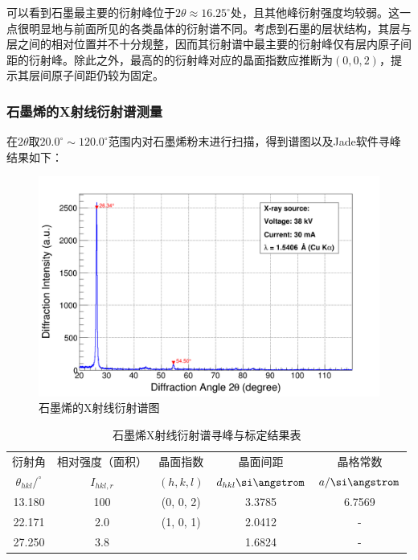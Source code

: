 \documentclass{thuemp}
\begin{document}
可以看到石墨最主要的衍射峰位于$2\theta \approx 16.25^\circ$处，且其他峰衍射强度均较弱。这一点很明显地与前面所见的各类晶体的衍射谱不同。考虑到石墨的层状结构，其层与层之间的相对位置并不十分规整，因而其衍射谱中最主要的衍射峰仅有层内原子间距的衍射峰。除此之外，最高的的衍射峰对应的晶面指数应推断为$(0,0,2)$，提示其层间原子间距仍较为固定。

\subsubsection{石墨烯的X射线衍射谱测量}

在$2\theta$取$20.0^\circ \sim 120.0^\circ$范围内对石墨烯粉末进行扫描，得到谱图以及Jade软件寻峰结果如下： 

\begin{figure}[H]
    \centering
    \includegraphics[width=0.8\linewidth]{../Data/C-Graphene-multi.png}
    \caption{石墨烯的X射线衍射谱图}
    \label{fig:graphene_xrd}
\end{figure}

\begin{table}
    \centering
    \captionnamefont{\wuhao\bf\heiti}
    \captiontitlefont{\wuhao\bf\heiti}
    \caption{石墨烯X射线衍射谱寻峰与标定结果表}
    \label{tab:graphene_xrd}
    \liuhao
    \begin{tabular}{ccccc}
        \toprule
        衍射角 & 相对强度（面积）& 晶面指数 & 晶面间距 & 晶格常数 \\
        $\theta_{hkl}/^\circ$ & $I_{hkl,r}$ & $(h,k,l)$ & $d_{hkl}\text{\si\angstrom}$ & $a/\text{\si\angstrom}$\\
        \midrule
        13.180 & 100& (0, 0, 2)& 3.3785 & 6.7569 \\
        22.171 & 2.0& (1, 0, 1)& 2.0412 &    -   \\
        27.250 & 3.8&          & 1.6824 &    -   \\
        \bottomrule
    \end{tabular}
\end{table}
\end{document}
